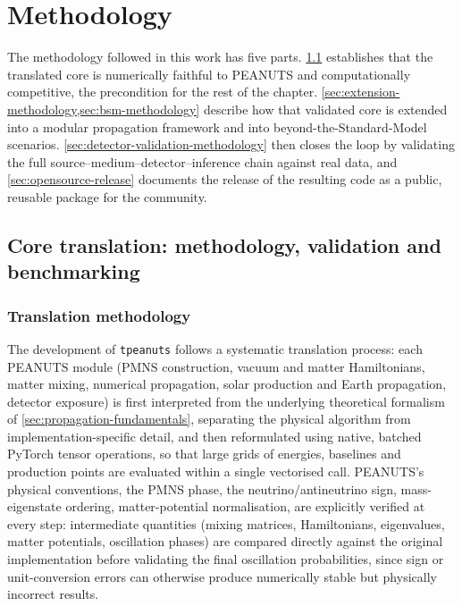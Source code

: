 \section{Methodology}
\label{sec:methodology}

The methodology followed in this work has five parts. \cref{sec:core-translation} establishes that the translated core is numerically faithful to PEANUTS and computationally competitive, the precondition for the rest of the chapter. \cref{sec:extension-methodology,sec:bsm-methodology} describe how that validated core is extended into a modular propagation framework and into beyond-the-Standard-Model scenarios. \cref{sec:detector-validation-methodology} then closes the loop by validating the full source--medium--detector--inference chain against real data, and \cref{sec:opensource-release} documents the release of the resulting code as a public, reusable package for the community.

\subsection{Core translation: methodology, validation and benchmarking}
\label{sec:core-translation}

\subsubsection{Translation methodology}

The development of \texttt{tpeanuts} follows a systematic translation process: each PEANUTS \parencite{Gonzalo2024} module (PMNS construction, vacuum and matter Hamiltonians, matter mixing, numerical propagation, solar production and Earth propagation, detector exposure) is first interpreted from the underlying theoretical formalism of \cref{sec:propagation-fundamentals}, separating the physical algorithm from implementation-specific detail, and then reformulated using native, batched PyTorch \parencite{Paszke2019} tensor operations, so that large grids of energies, baselines and production points are evaluated within a single vectorised call. PEANUTS's physical conventions, the PMNS phase, the neutrino/antineutrino sign, mass-eigenstate ordering, matter-potential normalisation, are explicitly verified at every step: intermediate quantities (mixing matrices, Hamiltonians, eigenvalues, matter potentials, oscillation phases) are compared directly against the original implementation before validating the final oscillation probabilities, since sign or unit-conversion errors can otherwise produce numerically stable but physically incorrect results.


